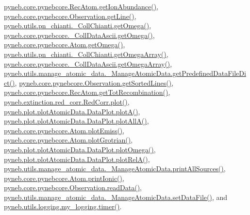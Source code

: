 \hyperlink{pynebcore_8py_source_l02961}{pyneb.\+core.\+pynebcore.\+Rec\+Atom.\+get\+Ion\+Abundance()}, \hyperlink{pynebcore_8py_source_l03543}{pyneb.\+core.\+pynebcore.\+Observation.\+get\+Line()}, \hyperlink{pn__chianti_8py_source_l00484}{pyneb.\+utils.\+pn\+\_\+chianti.\+\_\+\+Coll\+Chianti.\+get\+Omega()}, \hyperlink{pynebcore_8py_source_l01063}{pyneb.\+core.\+pynebcore.\+\_\+\+Coll\+Data\+Ascii.\+get\+Omega()}, \hyperlink{pynebcore_8py_source_l01262}{pyneb.\+core.\+pynebcore.\+Atom.\+get\+Omega()}, \hyperlink{pn__chianti_8py_source_l00461}{pyneb.\+utils.\+pn\+\_\+chianti.\+\_\+\+Coll\+Chianti.\+get\+Omega\+Array()}, \hyperlink{pynebcore_8py_source_l01039}{pyneb.\+core.\+pynebcore.\+\_\+\+Coll\+Data\+Ascii.\+get\+Omega\+Array()}, \hyperlink{manage__atomic__data_8py_source_l00034}{pyneb.\+utils.\+manage\+\_\+atomic\+\_\+data.\+\_\+\+Manage\+Atomic\+Data.\+get\+Predefined\+Data\+File\+Dict()}, \hyperlink{pynebcore_8py_source_l03562}{pyneb.\+core.\+pynebcore.\+Observation.\+get\+Sorted\+Lines()}, \hyperlink{pynebcore_8py_source_l02735}{pyneb.\+core.\+pynebcore.\+Rec\+Atom.\+get\+Tot\+Recombination()}, \hyperlink{red__corr_8py_source_l00303}{pyneb.\+extinction.\+red\+\_\+corr.\+Red\+Corr.\+plot()}, \hyperlink{plot_atomic_data_8py_source_l00116}{pyneb.\+plot.\+plot\+Atomic\+Data.\+Data\+Plot.\+plot\+A()}, \hyperlink{plot_atomic_data_8py_source_l00188}{pyneb.\+plot.\+plot\+Atomic\+Data.\+Data\+Plot.\+plot\+All\+A()}, \hyperlink{pynebcore_8py_source_l02313}{pyneb.\+core.\+pynebcore.\+Atom.\+plot\+Emiss()}, \hyperlink{pynebcore_8py_source_l02372}{pyneb.\+core.\+pynebcore.\+Atom.\+plot\+Grotrian()}, \hyperlink{plot_atomic_data_8py_source_l00372}{pyneb.\+plot.\+plot\+Atomic\+Data.\+Data\+Plot.\+plot\+Omega()}, \hyperlink{plot_atomic_data_8py_source_l00261}{pyneb.\+plot.\+plot\+Atomic\+Data.\+Data\+Plot.\+plot\+Rel\+A()}, \hyperlink{manage__atomic__data_8py_source_l00431}{pyneb.\+utils.\+manage\+\_\+atomic\+\_\+data.\+\_\+\+Manage\+Atomic\+Data.\+print\+All\+Sources()}, \hyperlink{pynebcore_8py_source_l02167}{pyneb.\+core.\+pynebcore.\+Atom.\+print\+Ionic()}, \hyperlink{pynebcore_8py_source_l03589}{pyneb.\+core.\+pynebcore.\+Observation.\+read\+Data()}, \hyperlink{manage__atomic__data_8py_source_l00380}{pyneb.\+utils.\+manage\+\_\+atomic\+\_\+data.\+\_\+\+Manage\+Atomic\+Data.\+set\+Data\+File()}, and \hyperlink{logging_8py_source_l00115}{pyneb.\+utils.\+logging.\+my\+\_\+logging.\+timer()}.

\hypertarget{classpyneb_1_1core_1_1pynebcore_1_1___coll_data_ascii_a8f7186365d566d4de80bf20b41b51c75}{}
